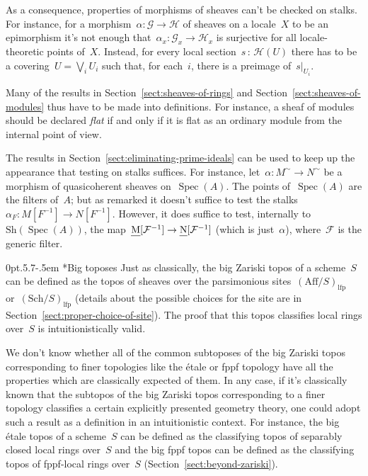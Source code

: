 \documentclass[10pt,reqno,a4paper]{amsbook}
\makeatletter
\theoremstyle{definition}
\theoremstyle{plain}
\theoremstyle{remark}
\newcommand{\F}{\mathcal{F}}
\renewcommand{\G}{\mathcal{G}}
\renewcommand{\H}{\mathcal{H}}
\let\oldul\ul
\renewcommand{\ul}[1]{\text{\oldul{$#1$}}}
\newcommand{\Sh}{\mathrm{Sh}}
\newcommand{\Sch}{\mathrm{Sch}}
\newcommand{\Aff}{\mathrm{Aff}}
\newcommand{\lfp}{\mathrm{lfp}}
\DeclareMathOperator{\Spec}{Spec}
\newcommand{\?}{\,{:}\,}
\renewcommand{\_}{\mathpunct{.}\,}
\def\subsection{\@startsection{subsection}{2}%
  {0pt}{.5\linespacing\@plus.7\linespacing}{-.5em}%
  {\normalfont\bfseries}}
\makeatother
\begin{document}
{As a consequence, properties of morphisms of sheaves can't be checked on
stalks. For instance, for a morphism~$\alpha : \G \to \H$ of sheaves on a
locale~$X$ to be an epimorphism it's not enough that~$\alpha_x : \G_x \to \H_x$
is surjective for all locale-theoretic points of~$X$. Instead, for every local
section~$s \? \H(U)$ there has to be a covering~$U = \bigvee_i U_i$ such that,
for each~$i$, there is a preimage of~$s|_{U_i}$.

Many of the results in Section~\ref{sect:sheaves-of-rings} and
Section~\ref{sect:sheaves-of-modules} thus have to be made into definitions.
For instance, a sheaf of modules should be declared \emph{flat} if and only if
it is flat as an ordinary module from the internal point of view.

The results in Section~\ref{sect:eliminating-prime-ideals} can be used to keep
up the appearance that testing on stalks suffices. For instance, let~$\alpha :
M^\sim \to N^\sim$ be a morphism of quasicoherent sheaves on~$\Spec(A)$. The
points of~$\Spec(A)$ are the filters of~$A$; but as remarked it doesn't suffice
to test the stalks~$\alpha_F : M[F^{-1}] \to N[F^{-1}]$. However, it does
suffice to test, internally to~$\Sh(\Spec(A))$, the map~$\ul{M}[\F^{-1}] \to
\ul{N}[\F^{-1}]$ (which is just~$\alpha$), where~$\F$ is the generic filter.


\subsection*{Big toposes} Just as classically, the big Zariski topos of a
scheme~$S$ can be defined as the topos of sheaves over the parsimonious
sites~$(\Aff/S)_\lfp$ or~$(\Sch/S)_\lfp$ (details about the possible choices
for the site are in Section~\ref{sect:proper-choice-of-site}). The proof that
this topos classifies local rings over~$S$ is intuitionistically valid.

We don't know whether all of the common subtoposes of the big Zariski topos
corresponding to finer topologies like the étale or fppf topology have all the
properties which are classically expected of them. In any case, if it's
classically known that the subtopos of the big Zariski topos corresponding to
a finer topology classifies a certain explicitly presented geometry
theory, one could adopt such a result as a definition in an intuitionistic
context. For instance, the big étale topos of a scheme~$S$ can be defined as
the classifying topos of separably closed local rings over~$S$ and the big fppf
topos can be defined as the classifying topos of fppf-local rings over~$S$
(Section~\ref{sect:beyond-zariski}).


}
\end{document}
